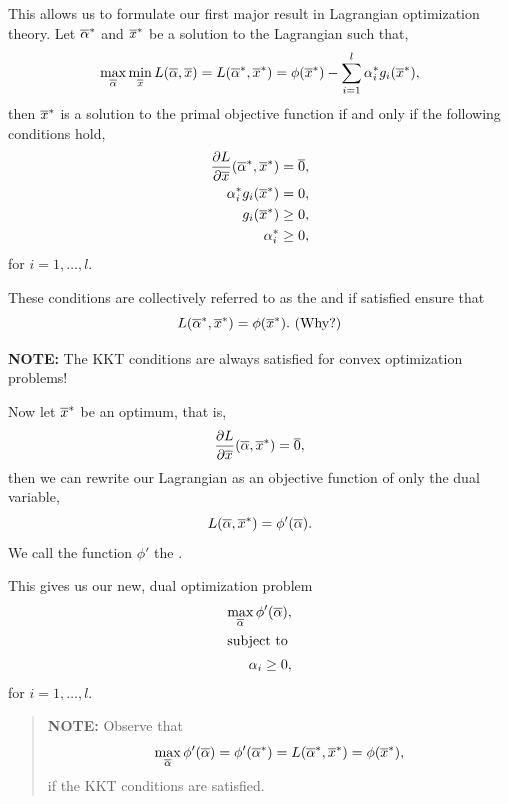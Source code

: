 \documentclass[a4paper,blends,pdf,colorBG,slideColor]{prosper}
\begin{document}
\small
This allows us to formulate our first major result in Lagrangian optimization theory.
Let $\overline{\alpha}^*$ and $\overline{x}^*$ be a solution to
the Lagrangian such that,
\begin{equation*}
\max_{\overline{\alpha}} \min_{\overline{x}} L(\overline{\alpha},\overline{x}) = L(\overline{\alpha}^*,\overline{x}^*)
	=  \phi(\overline{x}^*) - \sum_{i=1}^l \alpha^*_i g_i(\overline{x}^*),
\end{equation*}
then $\overline{x}^*$ is a solution to the primal
objective function if and only if the following conditions hold,
\begin{align*}
\frac{\partial L}{\partial \overline{x}}(\overline{\alpha}^*, \overline{x}^*) &= \overline{0},\\
\alpha^*_i g_i(\overline{x}^*) &= 0,\\
g_i(\overline{x}^*) &\ge 0,\\
\alpha_i^* &\ge 0,
\end{align*}
for $i = 1,\ldots,l$.

These conditions are collectively referred to as the 
and if satisfied ensure that
\begin{equation*}
L(\overline{\alpha}^*,\overline{x}^*) =  \phi(\overline{x}^*). \text{   (Why?)}
\end{equation*}

{\bf NOTE:} The KKT conditions are always satisfied for convex optimization problems!
 
\es

\small
Now let $\overline{x}^*$ be an optimum, that is,
\begin{equation*}
\frac{\partial L}{\partial \overline{x}} (\overline{\alpha},\overline{x}^*)= \overline{0},
\end{equation*}
then we can rewrite our Lagrangian as an objective function of only the dual variable,
\begin{equation*}
L(\overline{\alpha}, \overline{x}^*) = \phi'(\overline{\alpha}).
\end{equation*}
We call the function $\phi'$ the .

This gives us our new, dual optimization problem
\begin{align*}
 \max_{\overline{\alpha}} \phi'(\overline{\alpha}),\\
 \intertext{subject to}
 \alpha_i \ge 0,
\end{align*}
for $i = 1,\ldots,l$.

\begin{quote}
{\bf NOTE:} Observe that
\begin{equation*}
\max_{\overline{\alpha}} \phi'(\overline{\alpha}) = \phi'(\overline{\alpha}^*) = L(\overline{\alpha}^*,\overline{x}^*) =  \phi(\overline{x}^*),
\end{equation*}
if the KKT conditions are satisfied.
\end{quote}
\end{document}
